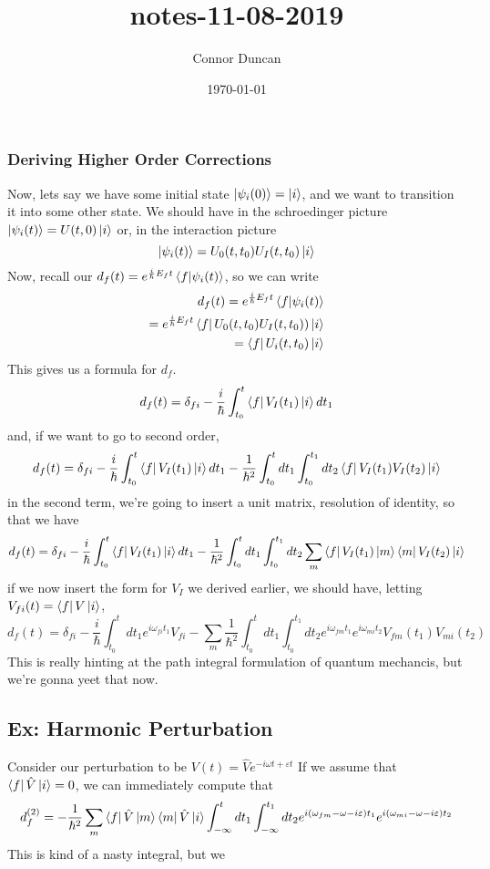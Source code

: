 \documentclass{article}
\author{Connor Duncan}
\date{\today}
\title{notes-11-08-2019}
\theoremstyle{definition}
\begin{document}
\subsubsection{Deriving Higher Order Corrections} Now, lets say we have some initial state $\ket{\psi_i(0)}=\ket{i}$, and we want to transition it into some other state. We should have in the schroedinger picture $\ket{\psi_i(t)}=U(t,0)\ket{i}$ or, in the interaction picture \begin{equation} \ket{\psi_i(t)}=U_0(t,t_0)U_I(t,t_0)\ket{i} \end{equation} Now, recall our $d_f(t)=e^{\frac{i}{\hbar}E_ft}\bra{f}\ket{\psi_i(t)}$, so we can write \begin{align} d_f(t)=e^{\frac{i}{\hbar}E_ft}\bra{f}\ket{\psi_i(t)} \\ =e^{\frac{i}{\hbar}E_ft}\bra{f}U_0(t,t_0)U_I(t,t_0))\ket{i} \\ =\bra{f}U_i(t,t_0)\ket{i} \end{align} This gives us a formula for $d_f$. \begin{equation} d_f(t)=\delta_{fi}-\frac{i}{\hbar}\int_{t_0}^{t}\bra{f}V_I(t_1)\ket{i}dt_1 \end{equation} and, if we want to go to second order, \begin{equation} d_f(t)=\delta_{fi}-\frac{i}{\hbar}\int_{t_0}^{t}\bra{f}V_I(t_1)\ket{i}dt_1 -\frac{1}{\hbar^2}\int_{t_0}^{t}dt_1\int_{t_0}^{t_1}dt_2\bra{f}V_I(t_1)V_I(t_2)\ket{i} \end{equation} in the second term, we're going to insert a unit matrix, resolution of identity, so that we have \begin{equation} d_f(t)=\delta_{fi}-\frac{i}{\hbar}\int_{t_0}^{t}\bra{f}V_I(t_1)\ket{i}dt_1 -\frac{1}{\hbar^2}\int_{t_0}^{t}dt_1\int_{t_0}^{t_1}dt_2\sum_{m}^{}\bra{f}V_I(t_1)\ket{m}\bra{m}V_I(t_2)\ket{i} \end{equation} if we now insert the form for $V_I$ we derived earlier, we should have, letting $V_{fi}(t)=\bra{f}V\ket{i}$, \begin{equation} d_f(t)=\delta_{fi} -\frac{i}{\hbar}\int_{t_0}^{t}dt_1e^{i\omega_{fi}t_1}V_{fi} -\sum_{m}^{}\frac{1}{\hbar^2}\int_{t_0}^{t}dt_1\int_{t_0}^{t_1}dt_2e^{i\omega_{fm}t_1}e^{i\omega_{mi}t_2}V_{fm}(t_1)V_{mi}(t_2) \end{equation} This is really hinting at the path integral formulation of quantum mechancis, but we're gonna yeet that now. \subsection{Ex: Harmonic Perturbation} Consider our perturbation to be $V(t)=\hat Ve^{-i\omega t+\varepsilon t}$ If we assume that $\bra{f}\hat V\ket{i}=0$, we can immediately compute that \begin{equation} d_f^{(2)}=-\frac{1}{\hbar^2}\sum_{m}\bra{f}\hat V\ket{m}\bra{m}\hat V\ket{i} \int_{-\infty}^{t}dt_1\int_{-\infty}^{t_1}dt_2 e^{i(\omega_{fm}-\omega-i\varepsilon)t_1} e^{i(\omega_{mi}-\omega-i\varepsilon)t_2} \end{equation} This is kind of a nasty integral, but we 
\end{document}
